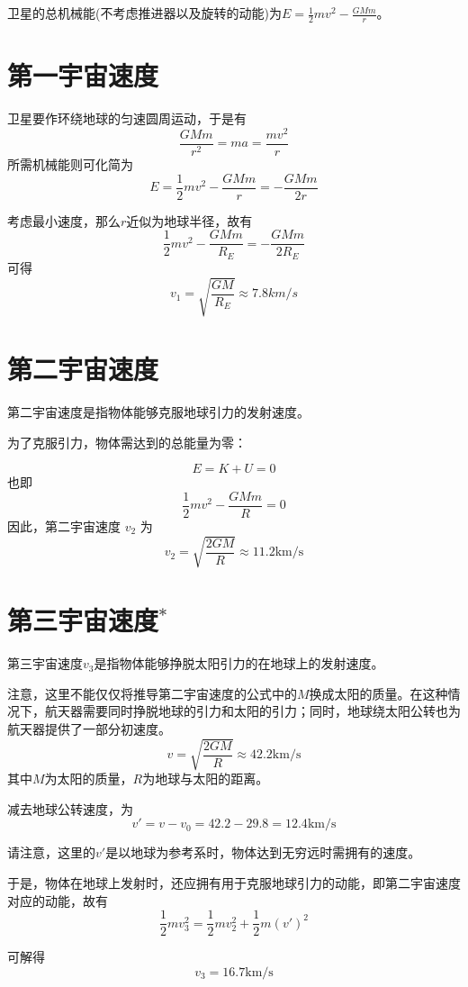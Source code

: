 \subsection[卫星运动]{}
卫星的总机械能(不考虑推进器以及旋转的动能)为$\displaystyle E=\frac{1}{2}mv^{2}-\frac{GMm}{r}$。

\section*{第一宇宙速度}
卫星要作环绕地球的匀速圆周运动，于是有
\[\frac{GMm}{r^{2}}=ma=\frac{mv^{2}}{r}\]
所需机械能则可化简为
\[E=\frac{1}{2}mv^{2}-\frac{GMm}{r}=-\frac{GMm}{2r}\]

考虑最小速度，那么$r$近似为地球半径，故有
\[\frac{1}{2}mv^{2}-\frac{GMm}{R_{E}}=-\frac{GMm}{2R_{E}}\]
可得
\[v_{1}=\sqrt{\frac{GM}{R_{E}}}\approx7.8km/s\]
\section*{第二宇宙速度}
第二宇宙速度是指物体能够克服地球引力的发射速度。

为了克服引力，物体需达到的总能量为零：

\[
E = K + U = 0
\]
也即
\[
\frac{1}{2}mv^2 - \frac{GMm}{R} = 0
\]
因此，第二宇宙速度 \( v_2 \) 为
\[
v_2 = \sqrt{\frac{2GM}{R}}\approx11.2\mathrm{km/s}
\]

\section*{第三宇宙速度$^*$}
第三宇宙速度$v_3$是指物体能够挣脱太阳引力的在地球上的发射速度。

注意，这里不能仅仅将推导第二宇宙速度的公式中的$M$换成太阳的质量。在这种情况下，航天器需要同时挣脱地球的引力和太阳的引力；同时，地球绕太阳公转也为航天器提供了一部分初速度。
\[
v = \sqrt{\frac{2GM}{R}}\approx42.2\mathrm{km/s}
\]
其中$M$为太阳的质量，$R$为地球与太阳的距离。

减去地球公转速度，为
\[v'=v-v_{0}=42.2-29.8=12.4\mathrm{km/s}\]

请注意，这里的$v'$是以地球为参考系时，物体达到无穷远时需拥有的速度。

于是，物体在地球上发射时，还应拥有用于克服地球引力的动能，即第二宇宙速度对应的动能，故有
\[\frac{1}{2}mv_{3}^{2}=\frac{1}{2}mv_{2}^{2}+\frac{1}{2}m(v')^{2}\]

可解得
\[v_{3}=16.7\mathrm{km/s}\]
